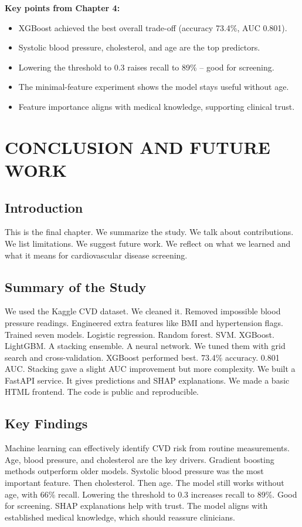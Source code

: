 \documentclass[12pt, a4paper, oneside]{book}
\begin{document}
\begin{takeaway}
\textbf{Key points from Chapter 4:}
\begin{itemize}
  \item XGBoost achieved the best overall trade-off (accuracy 73.4\%, AUC 0.801).
  \item Systolic blood pressure, cholesterol, and age are the top predictors.
  \item Lowering the threshold to 0.3 raises recall to 89\% – good for screening.
  \item The minimal-feature experiment shows the model stays useful without age.
  \item Feature importance aligns with medical knowledge, supporting clinical trust.
\end{itemize}
\end{takeaway}

\chapter{CONCLUSION AND FUTURE WORK}

\section{Introduction}
This is the final chapter. We summarize the study. We talk about contributions. We list limitations. We suggest future work. We reflect on what we learned and what it means for cardiovascular disease screening.

\section{Summary of the Study}
We used the Kaggle CVD dataset. We cleaned it. Removed impossible blood pressure readings. Engineered extra features like BMI and hypertension flags. Trained seven models. Logistic regression. Random forest. SVM. XGBoost. LightGBM. A stacking ensemble. A neural network. We tuned them with grid search and cross-validation. XGBoost performed best. 73.4\% accuracy. 0.801 AUC. Stacking gave a slight AUC improvement but more complexity. We built a FastAPI service. It gives predictions and SHAP explanations. We made a basic HTML frontend. The code is public and reproducible.

\section{Key Findings}
Machine learning can effectively identify CVD risk from routine measurements. Age, blood pressure, and cholesterol are the key drivers. Gradient boosting methods outperform older models. Systolic blood pressure was the most important feature. Then cholesterol. Then age. The model still works without age, with 66\% recall. Lowering the threshold to 0.3 increases recall to 89\%. Good for screening. SHAP explanations help with trust. The model aligns with established medical knowledge, which should reassure clinicians.
\end{document}
